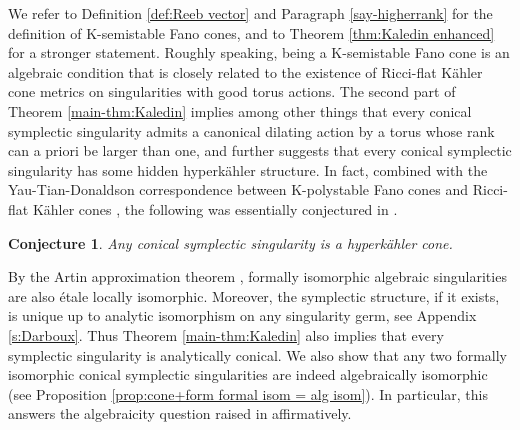 \documentclass[12pt]{amsart}
\newtheorem{conj}[prop]{Conjecture}
\theoremstyle{definition}
\numberwithin{equation}{section}
\begin{document}
We refer to Definition \ref{def:Reeb vector} and Paragraph \ref{say-higherrank} for the definition of K-semistable Fano cones, and to Theorem \ref{thm:Kaledin enhanced} for a stronger statement.  Roughly speaking, being a K-semistable Fano cone is an algebraic condition that is closely related to the existence of Ricci-flat K\"ahler cone metrics on singularities with good torus actions. The second part of Theorem \ref{main-thm:Kaledin} implies among other things that every conical symplectic singularity admits a canonical dilating action by a torus whose rank can a priori be larger than one, and further suggests that every conical symplectic singularity has some hidden hyperk\"ahler structure. 
In fact, combined with the Yau-Tian-Donaldson correspondence between K-polystable Fano cones and Ricci-flat K\"ahler cones \cite{Huang-thesis,Li-Fano-cone-YTD}, the following was essentially conjectured in \cite[Section 3.2]{XZ-open}.


\begin{conj}
Any conical symplectic singularity is  a hyperk\"ahler cone.
\end{conj}


By the Artin approximation theorem \cite[Corollary 2.6]{Artin-approx}, formally isomorphic algebraic singularities are also \'etale locally isomorphic. Moreover, the symplectic structure, if it exists, is unique up to analytic isomorphism on any singularity germ, see Appendix \ref{s:Darboux}. Thus Theorem \ref{main-thm:Kaledin} also implies that every symplectic singularity is analytically conical. %
We also show that any two formally isomorphic conical symplectic singularities are indeed algebraically isomorphic (see Proposition \ref{prop:cone+form formal isom = alg isom}). In particular, this answers the algebraicity question raised in \cite[Page 3]{Namikawa-torichyperkahler} affirmatively.
\end{document}
